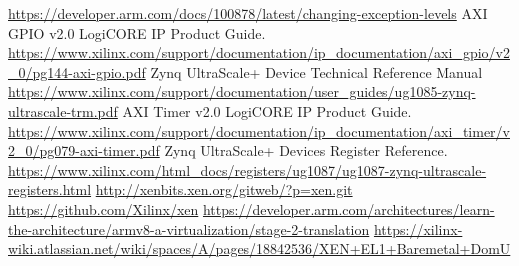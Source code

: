 \documentclass[spanish,12pt,a4paper,oneside]{book}
\begin{document}
\begin{thebibliography}{00}
	 \url{https://developer.arm.com/docs/100878/latest/changing-exception-levels}
   AXI GPIO v2.0 LogiCORE IP Product Guide. \url{https://www.xilinx.com/support/documentation/ip_documentation/axi_gpio/v2_0/pg144-axi-gpio.pdf}
   Zynq UltraScale+ Device Technical Reference Manual \url{https://www.xilinx.com/support/documentation/user_guides/ug1085-zynq-ultrascale-trm.pdf}
   AXI Timer v2.0 LogiCORE IP Product Guide. \url{https://www.xilinx.com/support/documentation/ip_documentation/axi_timer/v2_0/pg079-axi-timer.pdf}
   Zynq UltraScale+ Devices Register Reference. \url{https://www.xilinx.com/html_docs/registers/ug1087/ug1087-zynq-ultrascale-registers.html}
   \url{http://xenbits.xen.org/gitweb/?p=xen.git}
   \url{https://github.com/Xilinx/xen}
   \url{https://developer.arm.com/architectures/learn-the-architecture/armv8-a-virtualization/stage-2-translation}
   \url{https://xilinx-wiki.atlassian.net/wiki/spaces/A/pages/18842536/XEN+EL1+Baremetal+DomU}
\end{thebibliography}
\end{document}
